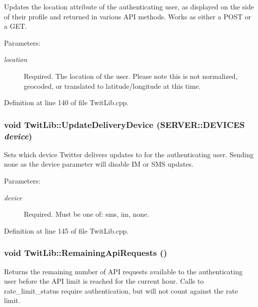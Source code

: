 Updates the location attribute of the authenticating user, as displayed on the side of their profile and returned in various API methods. Works as either a POST or a GET. \begin{Desc}
\item[Parameters:]
\begin{description}
\item[{\em location}]Required. The location of the user. Please note this is not normalized, geocoded, or translated to latitude/longitude at this time. \end{description}
\end{Desc}


Definition at line 140 of file TwitLib.cpp.\hypertarget{classTwitLib_b8fe352f9dc64231eddfaa86cfc473f9}{
\subsubsection{\setlength{\rightskip}{0pt plus 5cm}void TwitLib::UpdateDeliveryDevice ({\bf SERVER::DEVICES} {\em device})}}
\label{classTwitLib_b8fe352f9dc64231eddfaa86cfc473f9}


Sets which device Twitter delivers updates to for the authenticating user. Sending none as the device parameter will disable IM or SMS updates. \begin{Desc}
\item[Parameters:]
\begin{description}
\item[{\em device}]Required. Must be one of: sms, im, none. \end{description}
\end{Desc}


Definition at line 145 of file TwitLib.cpp.\hypertarget{classTwitLib_0a56abd6d94a6bccf0d761e7359c41ba}{
\subsubsection{\setlength{\rightskip}{0pt plus 5cm}void TwitLib::RemainingApiRequests ()}}
\label{classTwitLib_0a56abd6d94a6bccf0d761e7359c41ba}


Returns the remaining number of API requests available to the authenticating user before the API limit is reached for the current hour. Calls to rate\_\-limit\_\-status require authentication, but will not count against the rate limit. 

